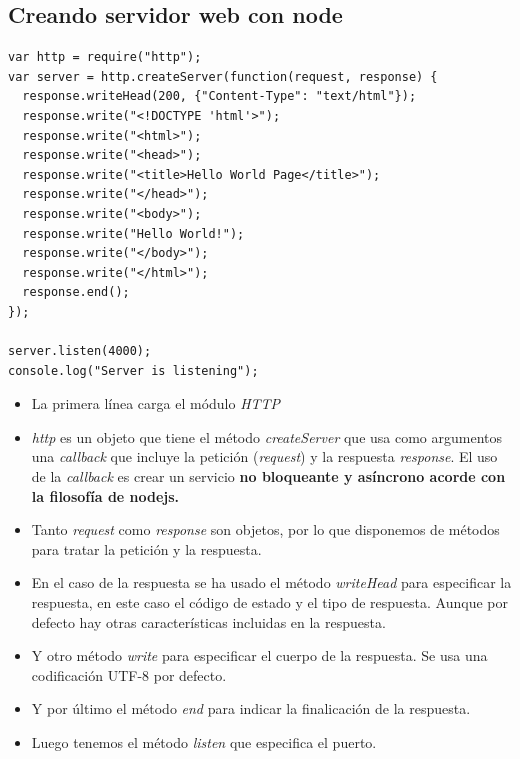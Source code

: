 \documentclass[4paper]{article}
\newcommand{\HT}{HTTP}
\begin{document}
\subsection{Creando servidor web con node}
\begin{verbatim}
var http = require("http");
var server = http.createServer(function(request, response) {
  response.writeHead(200, {"Content-Type": "text/html"});
  response.write("<!DOCTYPE 'html'>");
  response.write("<html>");
  response.write("<head>");
  response.write("<title>Hello World Page</title>");
  response.write("</head>");
  response.write("<body>");
  response.write("Hello World!");
  response.write("</body>");
  response.write("</html>");
  response.end();
});

server.listen(4000);
console.log("Server is listening");
\end{verbatim}

\begin{itemize}
\item La primera línea carga el módulo \emph{\HT}
\item \emph{http} es un objeto que tiene el método \emph{createServer} que usa como argumentos una \emph{callback} que incluye la petición (\emph{request}) y la respuesta \emph{\emph{response}}. El uso de la \emph{callback} es crear un servicio \textbf{no bloqueante y asíncrono acorde con la filosofía de nodejs.}
\item Tanto \emph{request} como \emph{response} son objetos, por lo que disponemos de métodos para tratar la petición y la respuesta.
\item En el caso de la respuesta se ha usado el método \emph{writeHead} para especificar la respuesta, en este caso el código de estado y el tipo de respuesta. Aunque por defecto hay otras características incluidas en la respuesta.
\item Y otro método \emph{write} para especificar el cuerpo de la respuesta. Se usa una codificación UTF-8 por defecto.
\item Y por último el método \emph{end} para indicar la finalicación de la respuesta.
\item Luego tenemos el método \emph{listen} que especifica el puerto.
\end{itemize}
\end{document}
